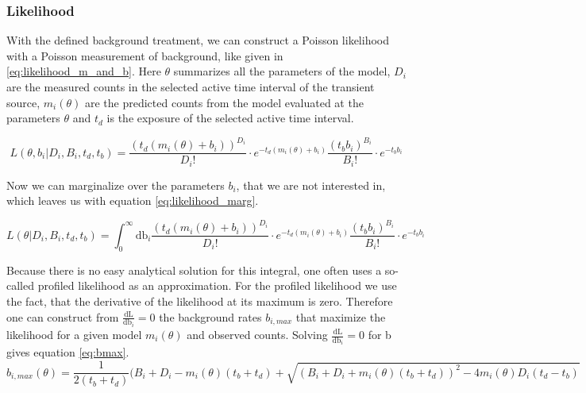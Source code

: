 \documentclass[twocolumn]{aa}
\begin{document}

\subsubsection*{Likelihood}

With the defined background treatment, we can construct a Poisson likelihood with a Poisson measurement of background, like given in \ref{eq:likelihood_m_and_b}. Here $\theta$ summarizes all the parameters of the model, $D_{i}$ are the measured counts in the selected active time interval of the transient source, $m_{i}(\theta)$ are the predicted counts from the model evaluated at the parameters $\theta$ and $t_{d}$ is the exposure of the selected active time interval.

\begin{equation}
	L(\theta, b_{i}|D_{i}, B_{i},t_{d},t_{b}) = \frac{(t_{d}(m_{i}(\theta)+ b_{i}))^{D_{i}}}{D_{i}!}\cdot e^{-t_{d}(m_{i}(\theta)+b_{i})} \frac{(t_{b} b_{i})^{B_{i}}}{B_{i}!}\cdot e^{-t_{b} b_{i}}
  \label{eq:likelihood_m_and_b}
\end{equation}

Now we can marginalize over the parameters $b_{i}$, that we are not interested in, which leaves us with equation \ref{eq:likelihood_marg}.

\begin{equation}
	L(\theta|D_{i}, B_{i},t_{d},t_{b}) = \int_{0}^{\infty}\textrm{db}_{i}\frac{(t_{d}(m_{i}(\theta)+ b_{i}))^{D_{i}}}{D_{i}!}\cdot e^{-t_{d}(m_{i}(\theta)+b_{i})} \frac{(t_{b} b_{i})^{B_{i}}}{B_{i}!}\cdot e^{-t_{b}b_{i}}
  \label{eq:likelihood_marg}
\end{equation}

Because there is no easy analytical solution for this integral, one often uses a so-called profiled likelihood as an approximation. For the profiled likelihood we use the fact, that the derivative of the likelihood at its maximum is zero. Therefore one can construct from $\frac{\textrm{dL}}{\textrm{db}_i}=0$ the background rates $b_{i, max}$ that maximize the likelihood for a given model $m_{i}(\theta)$ and observed counts. Solving $\frac{\textrm{dL}}{\textrm{db}_i}=0$ for b gives equation \ref{eq:bmax}.
\begin{equation}
	b_{i,max}(\theta)=\frac{1}{2(t_{b}+t_{d})}(B_{i}+D_{i}-m_{i}(\theta)(t_{b}+t_{d})+\sqrt{(B_{i}+D_{i}+m_{i}(\theta)(t_{b}+t_{d}))^{2}-4m_{i}(\theta)D_{i}(t_{d}-t_{b})}
  \label{eq:bmax}
\end{equation}
\end{document}
